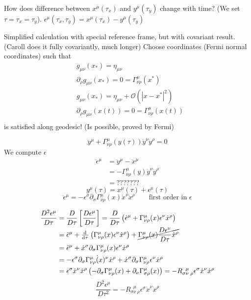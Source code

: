How does difference between $x^\mu(\tau_x)$ and $y^\mu(\tau_y)$ change with time? (We set $\tau=\tau_x=\tau_y$). $\epsilon^\mu(\tau_x,\tau_y) = x^\mu(\tau_x) - y^\mu(\tau_y)$


Simplified calculation with special reference frame, but with covariant result. (Caroll does it fully covariantly, much longer)
Choose coordinates (Fermi normal coordinates) such that
\begin{align*}
&g_{\mu\nu}(x_*) = \eta_{\mu\nu} \\
&\partial_\rho g_{\mu\nu}(x_*) = 0 = \Gamma_{\nu\rho}^\mu(x^*) \\
&g_{\mu\nu}(x_*) = \eta_{\mu\nu} + \mathcal{O}(|x-x^*|^2)\\
&\partial_\rho g_{\mu\nu}(x(t)) = 0 = \Gamma_{\nu\rho}^\mu(x(t)) \\
\end{align*}
is satisfied along geodesic! (Is possible, proved by Fermi)

\[ \ddot{y}^\mu + \Gamma^\mu_{\nu\rho}(y(\tau))\dot{y}^\nu \dot{y}^\rho = 0 \]
We compute $\epsilon$
\begin{align*}
\ddot{\epsilon}^\mu &= \ddot{y}^\mu - \ddot{x}^\mu \\
&= -\Gamma^\mu_{\nu\rho}(y) \dot{y}^\nu \dot{y}^\rho \\
&= ???????
\end{align*}
\[ y^\mu(\tau) = x^\mu(\tau) + \epsilon^\mu(\tau) \]
\[ \ddot{\epsilon}^\mu = -\epsilon^\sigma\partial_\sigma\Gamma^\mu_{\nu\rho}(x)\dot{x}^\nu \dot{x}^\rho \qquad \text{first order in $\epsilon$}\]

\begin{align*}
\frac{D^2 \epsilon^\mu}{D \tau} &= \frac{D}{D\tau}\left[\frac{D\epsilon^\mu}{D\tau}\right] = \frac{D}{D\tau}\left(\dot{\epsilon}^\mu+\Gamma^\mu_{\nu\rho}(x)\epsilon^\nu \dot{x}^\rho\right) \\
&= \ddot{\epsilon}^\mu + \od{}{\tau}\left(\Gamma^\mu_{\nu\rho}(x)\epsilon^\nu\dot{x}^\rho\right) + \cancel{\Gamma^\mu_{\nu\rho}(x)\frac{D\epsilon^\nu}{D\tau}\dot{x}^\rho} \\
&= \ddot{\epsilon}^\mu + \dot{x}^\sigma\partial_\sigma\Gamma^\mu_{\nu\rho}(x)\epsilon^\nu\dot{x}^\rho \\
&= -\epsilon^\sigma\partial_\sigma\Gamma^\mu_{\nu\rho}\dot(x)^\nu\dot{x}^\rho + \dot{x}^\sigma\partial_\sigma\Gamma^\mu_{\nu\rho}\epsilon^\nu\dot{x}^\rho \\
&= \epsilon^\sigma\dot{x}^\nu\dot{x}^\rho \left(-\partial_\sigma\Gamma^\mu_{\nu\rho}(x) + \partial_\nu\Gamma^\mu_{\sigma\rho}(x)\right) = - R_{\sigma\nu\;\rho}^{\;\;\mu}\epsilon^\sigma\dot{x}^\nu\dot{x}^\rho
\end{align*}
\[ \boxed{\frac{D^2\epsilon^\mu}{D\tau^2} = - R_{\sigma\nu\;\rho}^{\;\;\mu}\epsilon^\sigma\dot{x}^\nu\dot{x}^\rho} \]

